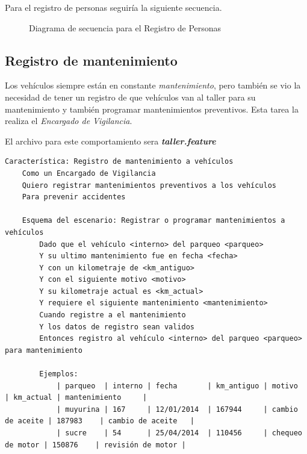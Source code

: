 Para el registro de personas seguiría la siguiente secuencia.

\begin{figure}[h]
  \begin{center}
    \def\svgwidth{\columnwidth}
    
    \caption[Diagrama de secuencia - Registro de personas]{
    Diagrama de secuencia para el Registro de Personas}
  \end{center}
\end{figure}

\subsection{Registro de mantenimiento}
Los vehículos siempre están en constante {\it mantenimiento},
pero también se vio la necesidad de tener un registro de que vehículos van al
taller para su mantenimiento y también programar mantenimientos preventivos.
Esta tarea la realiza el {\it Encargado de Vigilancia}.

El archivo para este comportamiento sera {\it \bfseries taller.feature}

{\scriptsize
\begin{verbatim}
Característica: Registro de mantenimiento a vehículos
    Como un Encargado de Vigilancia
    Quiero registrar mantenimientos preventivos a los vehículos
    Para prevenir accidentes

    Esquema del escenario: Registrar o programar mantenimientos a vehículos
        Dado que el vehículo <interno> del parqueo <parqueo>
        Y su ultimo mantenimiento fue en fecha <fecha>
        Y con un kilometraje de <km_antiguo>
        Y con el siguiente motivo <motivo>
        Y su kilometraje actual es <km_actual>
        Y requiere el siguiente mantenimiento <mantenimiento>
        Cuando registre a el mantenimiento
        Y los datos de registro sean validos
        Entonces registro al vehículo <interno> del parqueo <parqueo> para mantenimiento

        Ejemplos:
            | parqueo  | interno | fecha       | km_antiguo | motivo           | km_actual | mantenimiento     |
            | muyurina | 167     | 12/01/2014  | 167944     | cambio de aceite | 187983    | cambio de aceite   |
            | sucre    | 54      | 25/04/2014  | 110456     | chequeo de motor | 150876    | revisión de motor |
\end{verbatim}
}

